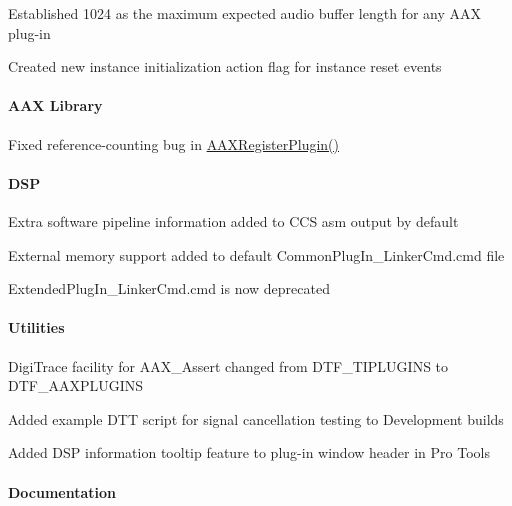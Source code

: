 \begin{DoxyItemize}
\item Established 1024 as the maximum expected audio buffer length for any A\+AX plug-\/in 
\item Created new instance initialization action flag for instance reset events 
\end{DoxyItemize}\hypertarget{a00847_aax_sdk_1p0p3_AAXLibrary}{}\paragraph{A\+A\+X Library}\label{a00847_aax_sdk_1p0p3_AAXLibrary}

\begin{DoxyItemize}
\item Fixed reference-\/counting bug in \mbox{\hyperlink{a00796_ga83d05333118598c179ca6d89487fa203}{A\+A\+X\+Register\+Plugin()}} 
\end{DoxyItemize}\hypertarget{a00847_aax_sdk_1p0p3_DSP}{}\paragraph{D\+SP}\label{a00847_aax_sdk_1p0p3_DSP}

\begin{DoxyItemize}
\item Extra software pipeline information added to C\+CS asm output by default 
\item External memory support added to default Common\+Plug\+In\+\_\+\+Linker\+Cmd.\+cmd file 
\begin{DoxyItemize}
\item Extended\+Plug\+In\+\_\+\+Linker\+Cmd.\+cmd is now deprecated 
\end{DoxyItemize}
\end{DoxyItemize}\hypertarget{a00847_aax_sdk_1p0p3_Utilities}{}\paragraph{Utilities}\label{a00847_aax_sdk_1p0p3_Utilities}

\begin{DoxyItemize}
\item Digi\+Trace facility for A\+A\+X\+\_\+\+Assert changed from D\+T\+F\+\_\+\+T\+I\+P\+L\+U\+G\+I\+NS to D\+T\+F\+\_\+\+A\+A\+X\+P\+L\+U\+G\+I\+NS 
\item Added example D\+TT script for signal cancellation testing to Development builds 
\item Added D\+SP information tooltip feature to plug-\/in window header in Pro Tools 
\end{DoxyItemize}\hypertarget{a00847_aax_sdk_1p0p3_Documentation}{}\paragraph{Documentation}\label{a00847_aax_sdk_1p0p3_Documentation}

